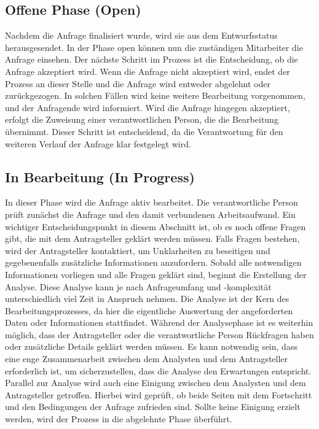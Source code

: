 \subsection*{Offene Phase (Open)}
Nachdem die Anfrage finalisiert wurde, wird sie aus dem Entwurfsstatus herausgesendet. In der Phase \grqq open\grqq{}  können nun die zuständigen Mitarbeiter die Anfrage einsehen.
\newline
Der nächste Schritt im Prozess ist die Entscheidung, ob die Anfrage akzeptiert wird. Wenn die Anfrage nicht akzeptiert wird, endet der Prozess an dieser Stelle und die Anfrage wird entweder abgelehnt oder zurückgezogen. In solchen Fällen wird keine weitere Bearbeitung vorgenommen, und der Anfragende wird informiert.
\newline
Wird die Anfrage hingegen akzeptiert, erfolgt die Zuweisung einer verantwortlichen Person, die die Bearbeitung übernimmt. Dieser Schritt ist entscheidend, da die Verantwortung für den weiteren Verlauf der Anfrage klar festgelegt wird.
\subsection*{In Bearbeitung (In Progress)}
In dieser Phase wird die Anfrage aktiv bearbeitet. Die verantwortliche Person prüft zunächst die Anfrage und den damit verbundenen Arbeitsaufwand. Ein wichtiger Entscheidungspunkt in diesem Abschnitt ist, ob es noch offene Fragen gibt, die mit dem Antragsteller geklärt werden müssen. Falls Fragen bestehen, wird der Antragsteller kontaktiert, um Unklarheiten zu beseitigen und gegebenenfalls zusätzliche Informationen anzufordern.
\newline
Sobald alle notwendigen Informationen vorliegen und alle Fragen geklärt sind, beginnt die Erstellung der Analyse. Diese Analyse kann je nach Anfrageumfang und -komplexität unterschiedlich viel Zeit in Anspruch nehmen. Die Analyse ist der Kern des Bearbeitungsprozesses, da hier die eigentliche Auswertung der angeforderten Daten oder Informationen stattfindet.
\newline
Während der Analysephase ist es weiterhin möglich, dass der Antragsteller oder die verantwortliche Person Rückfragen haben oder zusätzliche Details geklärt werden müssen. Es kann notwendig sein, dass eine enge Zusammenarbeit zwischen dem Analysten und dem Antragsteller erforderlich ist, um sicherzustellen, dass die Analyse den Erwartungen entspricht.
\newline
Parallel zur Analyse wird auch eine Einigung zwischen dem Analysten und dem Antragsteller getroffen. Hierbei wird geprüft, ob beide Seiten mit dem Fortschritt und den Bedingungen der Anfrage zufrieden sind. Sollte keine Einigung erzielt werden, wird der Prozess in die abgelehnte Phase überführt.
